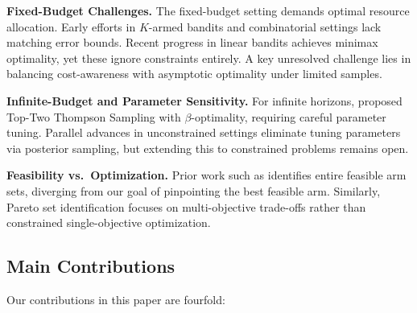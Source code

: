 \documentclass[accepted]{uai2025} %
\theoremstyle{plain}
\theoremstyle{definition}
\theoremstyle{remark}
\begin{document}
\textbf{Fixed-Budget Challenges.} The fixed-budget setting demands optimal resource allocation. Early efforts in \( K \)-armed bandits \citep{faizal2022constrained} and combinatorial settings \citep{tang2024pure} lack matching error bounds. Recent progress in linear bandits \citep{yang2022minimax} achieves minimax optimality, yet these ignore constraints entirely. A key unresolved challenge lies in balancing cost-awareness with asymptotic optimality under limited samples.

\textbf{Infinite-Budget and Parameter Sensitivity.} For infinite horizons, \citet{yang2025stochastically} proposed Top-Two Thompson Sampling with \( \beta \)-optimality, requiring careful parameter tuning. Parallel advances in unconstrained settings \citep{li2024optimal} eliminate tuning parameters via posterior sampling, but extending this to constrained problems remains open.

\textbf{Feasibility vs.\ Optimization.} Prior work such as \citet{katz2018feasible} identifies entire feasible arm sets, diverging from our goal of pinpointing the best feasible arm. Similarly, Pareto set identification \citep{kone2024pareto} focuses on multi-objective trade-offs rather than constrained single-objective optimization.

\vspace{-.1in}
\subsection{Main Contributions}\vspace{-.1in}
Our contributions in this paper are fourfold:
\end{document}
